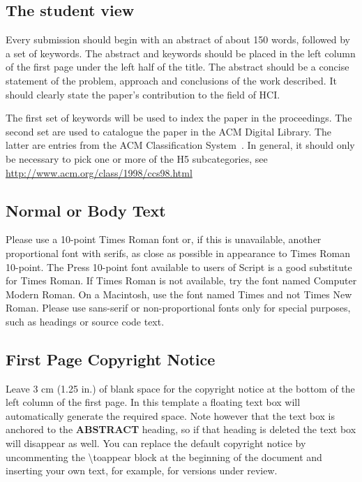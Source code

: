 \documentclass{sigchi}
\begin{document}
\subsection{The student view}

Every submission should begin with an abstract of about 150 words,
followed by a set of keywords. The abstract and keywords should be
placed in the left column of the first page under the left half of the
title. The abstract should be a concise statement of the problem,
approach and conclusions of the work described.  It should clearly
state the paper's contribution to the field of HCI.

The first set of keywords will be used to index the paper in the
proceedings. The second set are used to catalogue the paper in the ACM
Digital Library. The latter are entries from the ACM Classification
System~\cite{acm_categories}.  In general, it should only be necessary
to pick one or more of the H5 subcategories, see
\url{http://www.acm.org/class/1998/ccs98.html}

\subsection{Normal or Body Text}

Please use a 10-point Times Roman font or, if this is unavailable,
another proportional font with serifs, as close as possible in
appearance to Times Roman 10-point. The Press 10-point font available
to users of Script is a good substitute for Times Roman. If Times
Roman is not available, try the font named Computer Modern Roman. On a
Macintosh, use the font named Times and not Times New Roman. Please
use sans-serif or non-proportional fonts only for special purposes,
such as headings or source code text.

\subsection{First Page Copyright Notice}

Leave 3 cm (1.25 in.) of blank space for the copyright notice at the
bottom of the left column of the first page. In this template a
floating text box will automatically generate the required space. Note
however that the text box is anchored to the \textbf{ABSTRACT}
heading, so if that heading is deleted the text box will disappear as
well.  You can replace the default copyright notice by uncommenting
the {\textbackslash}toappear block at the beginning of the document
and inserting your own text, for example, for versions under review.
\end{document}
